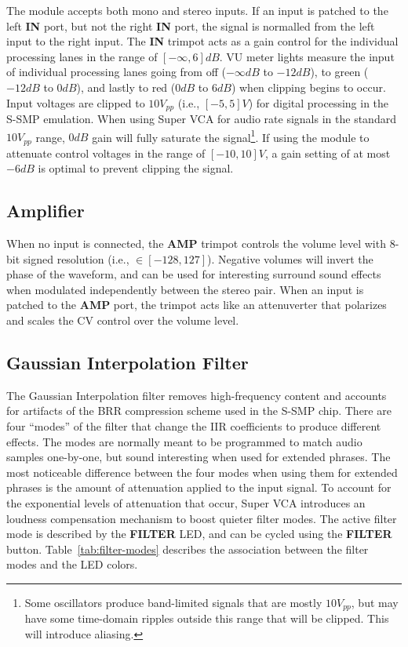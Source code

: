 \documentclass[12pt,letter]{article}
\begin{document}
The module accepts both mono and stereo inputs. If an input is patched to the left \textbf{IN} port, but not the right \textbf{IN} port, the signal is normalled from the left input to the right input. The \textbf{IN} trimpot acts as a gain control for the individual processing lanes in the range of $[-\infty, 6]dB$. VU meter lights measure the input of individual processing lanes going from off ($-\infty dB$ to $-12dB$), to green ($-12dB$ to $0dB$), and lastly to red ($0dB$ to $6dB$) when clipping begins to occur. Input voltages are clipped to $10V_{pp}$ (i.e., $[-5, 5]V$) for digital processing in the S-SMP emulation. When using Super VCA for audio rate signals in the standard $10V_{pp}$ range, $0dB$ gain will fully saturate the signal\footnote{Some oscillators produce band-limited signals that are mostly $10V_{pp}$, but may have some time-domain ripples outside this range that will be clipped. This will introduce aliasing.}. If using the module to attenuate control voltages in the range of $[-10, 10]V$, a gain setting of at most $-6dB$ is optimal to prevent clipping the signal.

\subsection{Amplifier}

When no input is connected, the \textbf{AMP} trimpot controls the volume level with 8-bit signed resolution (i.e., $\in [-128, 127]$). Negative volumes will invert the phase of the waveform, and can be used for interesting surround sound effects when modulated independently between the stereo pair. When an input is patched to the \textbf{AMP} port, the trimpot acts like an attenuverter that polarizes and scales the CV control over the volume level.

\subsection{Gaussian Interpolation Filter}

The Gaussian Interpolation filter removes high-frequency content and accounts for artifacts of the BRR compression scheme used in the S-SMP chip. There are four ``modes'' of the filter that change the IIR coefficients to produce different effects. The modes are normally meant to be programmed to match audio samples one-by-one, but sound interesting when used for extended phrases. The most noticeable difference between the four modes when using them for extended phrases is the amount of attenuation applied to the input signal. To account for the exponential levels of attenuation that occur, Super VCA introduces an loudness compensation mechanism to boost quieter filter modes. The active filter mode is described by the \textbf{FILTER} LED, and can be cycled using the \textbf{FILTER} button. Table~\ref{tab:filter-modes} describes the association between the filter modes and the LED colors.
\end{document}
